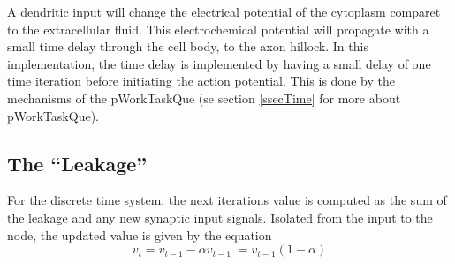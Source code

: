 	A dendritic input will change the electrical potential of the cytoplasm comparet to the extracellular fluid. This electrochemical potential will propagate with a small time delay through the cell body, to the axon hillock.
	In this implementation, the time delay is implemented by having a small delay of one time iteration before initiating the action potential.
	This is done by the mechanisms of the pWorkTaskQue (se section \ref{ssecTime} for more about pWorkTaskQue).%


	
	


	\subsection{The ``Leakage''}
	\label{secTheLeakageForSANN}
	For the discrete time system, the next iterations value is computed as the sum of the leakage and any new synaptic input signals.
	Isolated from the input to the node, the updated value is given by the equation
	\begin{equation}
		v_t = v_{t-1} - \alpha v_{t-1} \; = v_{t-1} (1-\alpha)
	\end{equation}

